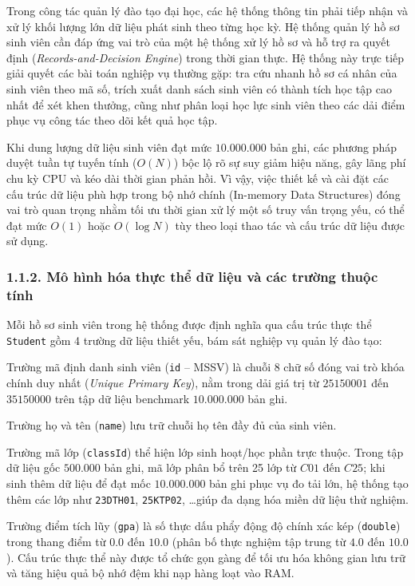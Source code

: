 \documentclass[14pt,a4paper]{extarticle}
\begin{document}
Trong công tác quản lý đào tạo đại học, các hệ thống thông tin phải tiếp nhận và xử lý khối lượng lớn dữ liệu phát sinh theo từng học kỳ. Hệ thống quản lý hồ sơ sinh viên cần đáp ứng vai trò của một hệ thống xử lý hồ sơ và hỗ trợ ra quyết định (\textit{Records-and-Decision Engine}) trong thời gian thực. Hệ thống này trực tiếp giải quyết các bài toán nghiệp vụ thường gặp: tra cứu nhanh hồ sơ cá nhân của sinh viên theo mã số, trích xuất danh sách sinh viên có thành tích học tập cao nhất để xét khen thưởng, cũng như phân loại học lực sinh viên theo các dải điểm phục vụ công tác theo dõi kết quả học tập.

Khi dung lượng dữ liệu sinh viên đạt mức $10.000.000$ bản ghi, các phương pháp duyệt tuần tự tuyến tính ($O(N)$) bộc lộ rõ sự suy giảm hiệu năng, gây lãng phí chu kỳ CPU và kéo dài thời gian phản hồi. Vì vậy, việc thiết kế và cài đặt các cấu trúc dữ liệu phù hợp trong bộ nhớ chính (In-memory Data Structures) đóng vai trò quan trọng nhằm tối ưu thời gian xử lý một số truy vấn trọng yếu, có thể đạt mức $O(1)$ hoặc $O(\log N)$ tùy theo loại thao tác và cấu trúc dữ liệu được sử dụng.

\subsubsection*{1.1.2. Mô hình hóa thực thể dữ liệu và các trường thuộc tính}
{}

Mỗi hồ sơ sinh viên trong hệ thống được định nghĩa qua cấu trúc thực thể \texttt{Student} gồm 4 trường dữ liệu thiết yếu, bám sát nghiệp vụ quản lý đào tạo:

Trường mã định danh sinh viên (\texttt{id} -- MSSV) là chuỗi 8 chữ số đóng vai trò khóa chính duy nhất (\textit{Unique Primary Key}), nằm trong dải giá trị từ $25150001$ đến $35150000$ trên tập dữ liệu benchmark $10.000.000$ bản ghi.

Trường họ và tên (\texttt{name}) lưu trữ chuỗi họ tên đầy đủ của sinh viên.

Trường mã lớp (\texttt{classId}) thể hiện lớp sinh hoạt/học phần trực thuộc. Trong tập dữ liệu gốc $500.000$ bản ghi, mã lớp phân bổ trên 25 lớp từ $C01$ đến $C25$; khi sinh thêm dữ liệu để đạt mốc $10.000.000$ bản ghi phục vụ đo tải lớn, hệ thống tạo thêm các lớp như \texttt{23DTH01}, \texttt{25KTP02}, \dots giúp đa dạng hóa miền dữ liệu thử nghiệm.

Trường điểm tích lũy (\texttt{gpa}) là số thực dấu phẩy động độ chính xác kép (\texttt{double}) trong thang điểm từ $0.0$ đến $10.0$ (phân bố thực nghiệm tập trung từ $4.0$ đến $10.0$). Cấu trúc thực thể này được tổ chức gọn gàng để tối ưu hóa không gian lưu trữ và tăng hiệu quả bộ nhớ đệm khi nạp hàng loạt vào RAM.
\end{document}
